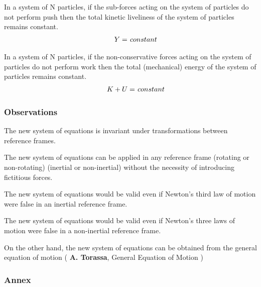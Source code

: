\documentclass[10pt,fleqn]{article}
\newcommand{\mY}{Y}
\newcommand{\mK}{K}
\newcommand{\mU}{U}
\begin{document}
\par In a system of N particles, if the sub-forces acting on the system of particles do not perform push then the total kinetic liveliness of the system of particles remains constant.
\begin{eqnarray*}
\hspace{+1.50em} \mY = \hspace{+0.09em} constant
\end{eqnarray*}
\par In a system of N particles, if the non-conservative forces acting on the system of particles do not perform work then the total (mechanical) energy of the system of particles remains constant.
\begin{eqnarray*}
\hspace{+1.50em} \mK + \mU = \hspace{+0.09em} constant
\end{eqnarray*}

\vspace{+0.90em}

{\centering\subsubsection*{Observations}}

\vspace{+1.20em}

\par The new system of equations is invariant under transformations between reference frames.
\bigskip
\par The new system of equations can be applied in any reference frame (rotating or non-rotating) (inertial or non-inertial) without the necessity of introducing fictitious forces.
\bigskip
\par The new system of equations would be valid even if Newton's third law of motion were false in an inertial reference frame.
\bigskip
\par The new system of equations would be valid even if Newton's three laws of motion were false in a non-inertial reference frame.
\bigskip
\par On the other hand, the new system of equations can be obtained from the general equation of motion ( \hspace{-0.45em} \textbf{A. Torassa}, General Equation of Motion \hspace{-0.45em} )

\newpage

{\centering\subsubsection*{Annex}}
\end{document}
